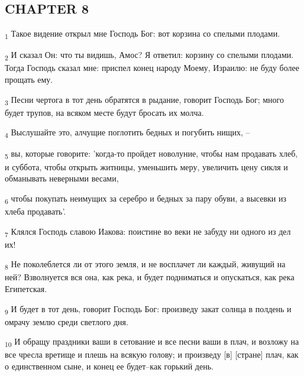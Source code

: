 \subsection{CHAPTER 8}
\begin{tcolorbox}
\textsubscript{1} Такое видение открыл мне Господь Бог: вот корзина со спелыми плодами.
\end{tcolorbox}
\begin{tcolorbox}
\textsubscript{2} И сказал Он: что ты видишь, Амос? Я ответил: корзину со спелыми плодами. Тогда Господь сказал мне: приспел конец народу Моему, Израилю: не буду более прощать ему.
\end{tcolorbox}
\begin{tcolorbox}
\textsubscript{3} Песни чертога в тот день обратятся в рыдание, говорит Господь Бог; много будет трупов, на всяком месте будут бросать их молча.
\end{tcolorbox}
\begin{tcolorbox}
\textsubscript{4} Выслушайте это, алчущие поглотить бедных и погубить нищих, --
\end{tcolorbox}
\begin{tcolorbox}
\textsubscript{5} вы, которые говорите: 'когда-то пройдет новолуние, чтобы нам продавать хлеб, и суббота, чтобы открыть житницы, уменьшить меру, увеличить цену сикля и обманывать неверными весами,
\end{tcolorbox}
\begin{tcolorbox}
\textsubscript{6} чтобы покупать неимущих за серебро и бедных за пару обуви, а высевки из хлеба продавать'.
\end{tcolorbox}
\begin{tcolorbox}
\textsubscript{7} Клялся Господь славою Иакова: поистине во веки не забуду ни одного из дел их!
\end{tcolorbox}
\begin{tcolorbox}
\textsubscript{8} Не поколеблется ли от этого земля, и не восплачет ли каждый, живущий на ней? Взволнуется вся она, как река, и будет подниматься и опускаться, как река Египетская.
\end{tcolorbox}
\begin{tcolorbox}
\textsubscript{9} И будет в тот день, говорит Господь Бог: произведу закат солнца в полдень и омрачу землю среди светлого дня.
\end{tcolorbox}
\begin{tcolorbox}
\textsubscript{10} И обращу праздники ваши в сетование и все песни ваши в плач, и возложу на все чресла вретище и плешь на всякую голову; и произведу [в] [стране] плач, как о единственном сыне, и конец ее будет--как горький день.
\end{tcolorbox}
